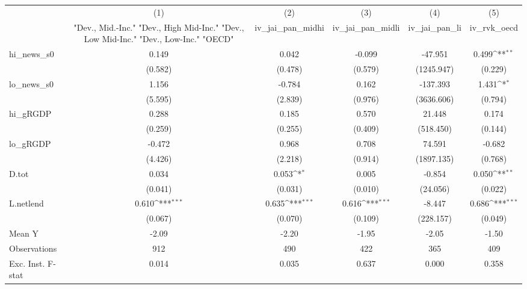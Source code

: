 {
\def\sym#1{\ifmmode^{#1}\else\(^{#1}\)\fi}
\begin{tabular}{l*{5}{c}}
\toprule
            &\multicolumn{1}{c}{(1)}&\multicolumn{1}{c}{(2)}&\multicolumn{1}{c}{(3)}&\multicolumn{1}{c}{(4)}&\multicolumn{1}{c}{(5)}\\
            &\multicolumn{1}{c}{ "Dev., Mid.-Inc." "Dev., High Mid-Inc." "Dev., Low Mid-Inc." "Dev., Low-Inc." "OECD" }&\multicolumn{1}{c}{iv\_jai\_pan\_midhi}&\multicolumn{1}{c}{iv\_jai\_pan\_midli}&\multicolumn{1}{c}{iv\_jai\_pan\_li}&\multicolumn{1}{c}{iv\_rvk\_oecd}\\
\midrule
hi\_news\_s0  &       0.149         &       0.042         &      -0.099         &     -47.951         &       0.499\sym{**} \\
            &     (0.582)         &     (0.478)         &     (0.579)         &  (1245.947)         &     (0.229)         \\
\addlinespace
lo\_news\_s0  &       1.156         &      -0.784         &       0.162         &    -137.393         &       1.431\sym{*}  \\
            &     (5.595)         &     (2.839)         &     (0.976)         &  (3636.606)         &     (0.794)         \\
\addlinespace
hi\_gRGDP    &       0.288         &       0.185         &       0.570         &      21.448         &       0.174         \\
            &     (0.259)         &     (0.255)         &     (0.409)         &   (518.450)         &     (0.144)         \\
\addlinespace
lo\_gRGDP    &      -0.472         &       0.968         &       0.708         &      74.591         &      -0.682         \\
            &     (4.426)         &     (2.218)         &     (0.914)         &  (1897.135)         &     (0.768)         \\
\addlinespace
D.tot       &       0.034         &       0.053\sym{*}  &       0.005         &      -0.854         &       0.050\sym{**} \\
            &     (0.041)         &     (0.031)         &     (0.010)         &    (24.056)         &     (0.022)         \\
\addlinespace
L.netlend   &       0.610\sym{***}&       0.635\sym{***}&       0.616\sym{***}&      -8.447         &       0.686\sym{***}\\
            &     (0.067)         &     (0.070)         &     (0.109)         &   (228.157)         &     (0.049)         \\
\midrule
Mean Y      &       -2.09         &       -2.20         &       -1.95         &       -2.05         &       -1.50         \\
Observations&         912         &         490         &         422         &         365         &         409         \\
Exc. Inst. F-stat&       0.014         &       0.035         &       0.637         &       0.000         &       0.358         \\
\bottomrule
\end{tabular}
}
